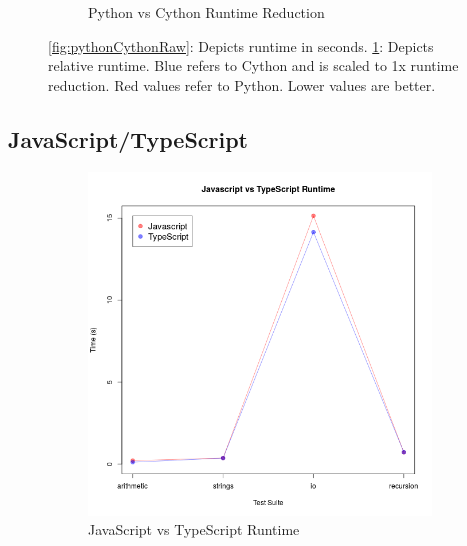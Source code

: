 \begin{figure}[H]
\begin{subfigure}{.5\textwidth}
  \caption{Python vs Cython Runtime Reduction}
  \label{fig:pythonCythonRelative}
\end{subfigure}
\caption{\ref{fig:pythonCythonRaw}: Depicts runtime in seconds. \ref{fig:pythonCythonRelative}: Depicts relative runtime. Blue refers to Cython  and is scaled to 1x runtime reduction. Red values refer to Python. Lower values are better.}
\label{fig:pythonCython}
\end{figure}



\subsection{JavaScript/TypeScript}

\begin{figure}[H]
\centering
\begin{subfigure}{.5\textwidth}
  \centering
  \includegraphics[width=\linewidth]{../src/Javascript_typed_vs_untyped.png}
  \caption{JavaScript vs TypeScript Runtime}
  \label{fig:javascriptTypescriptRaw}
\end{subfigure}%
\begin{subfigure}{.5\textwidth}
  \centering

\end{subfigure}
\end{figure}
